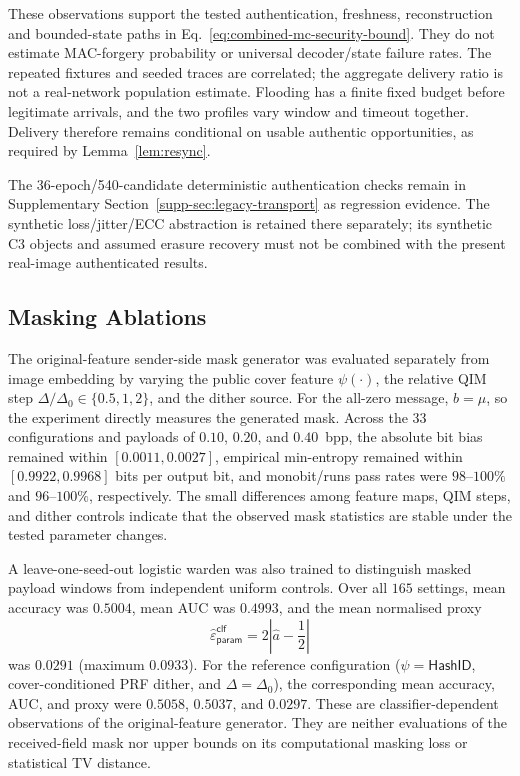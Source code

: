 \documentclass[pdflatex,sn-mathphys-num]{sn-jnl}%
\theoremstyle{definition}
\theoremstyle{game}
\theoremstyle{thmstyleone}%
\theoremstyle{thmstyletwo}%
\theoremstyle{thmstylethree}%
\begin{document}
These observations support the tested authentication, freshness,
reconstruction and bounded-state paths in
Eq.~\eqref{eq:combined-mc-security-bound}. They do not estimate MAC-forgery
probability or universal decoder/state failure rates. The repeated
fixtures and seeded traces are correlated; the aggregate delivery ratio
is not a real-network population estimate. Flooding has a finite fixed
budget before legitimate arrivals, and the two profiles vary window
and timeout together. Delivery therefore remains conditional on usable
authentic opportunities, as required by Lemma~\ref{lem:resync}.

The 36-epoch/540-candidate deterministic authentication checks
remain in Supplementary Section~\ref{supp-sec:legacy-transport} as
regression evidence. The synthetic loss/jitter/ECC abstraction is retained
there separately; its synthetic C3 objects and assumed erasure recovery
must not be combined with the present real-image authenticated results.


\subsection{Masking Ablations}
\label{subsec:masking_ablations}

The original-feature sender-side mask generator was evaluated separately from
image embedding by
varying the public cover feature $\psi(\cdot)$, the relative QIM step
$\Delta/\Delta_0\in\{0.5,1,2\}$, and the dither source. For the all-zero
message, $b=\mu$, so the experiment directly measures the generated mask.
Across the $33$ configurations and payloads of $0.10$, $0.20$, and
$0.40$~bpp, the absolute bit bias remained within
$[0.0011,0.0027]$, empirical min-entropy remained within
$[0.9922,0.9968]$ bits per output bit, and monobit/runs pass rates were
$98$--$100\%$ and $96$--$100\%$, respectively. The small differences among
feature maps, QIM steps, and dither controls indicate that the observed mask
statistics are stable under the tested parameter changes.

A leave-one-seed-out logistic warden was also trained to distinguish masked
payload windows from independent uniform controls. Over all $165$ settings,
mean accuracy was $0.5004$, mean AUC was $0.4993$, and the mean normalised
proxy
\begin{equation}
 \widehat{\varepsilon}_{\mathsf{param}}^{\mathsf{clf}}
 =
 2\left|\widehat a-\frac12\right|
\end{equation}
was $0.0291$ (maximum $0.0933$). For the reference configuration
($\psi=\textsf{HashID}$, cover-conditioned PRF dither, and
$\Delta=\Delta_0$), the corresponding mean accuracy, AUC, and proxy were
$0.5058$, $0.5037$, and $0.0297$. These are classifier-dependent observations of the original-feature generator.
They are neither evaluations of the received-field mask nor upper
bounds on its computational masking loss or statistical TV distance.
\end{document}
